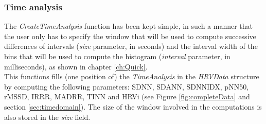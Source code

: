 \documentclass[12pt,lot, lof]{puthesis}
\begin{document}
\subsubsection{Time analysis} The \textit{CreateTimeAnalysis} function has been 
kept simple, in such a manner that the user only has to specify the window that
will be used to compute successive differences of intervals (\textit{size} 
parameter, in seconds) and the interval width of the bins that will be used to 
compute the histogram (\textit{interval} parameter, in milliseconds), as shown 
in chapter \ref{ch:Quick}. \\

This functions fills (one position of) the \textit{TimeAnalysis} in the 
\textit{HRVData} structure by computing the following parameters: SDNN, SDANN, 
SDNNIDX, pNN50, rMSSD, IRRR, MADRR, TINN and HRVi (see Figure 
\ref{fig:completeData} and section \ref{sec:timedomain}). The size of the 
window involved in the computations is also stored in the \textit{size} field.
\end{document}
